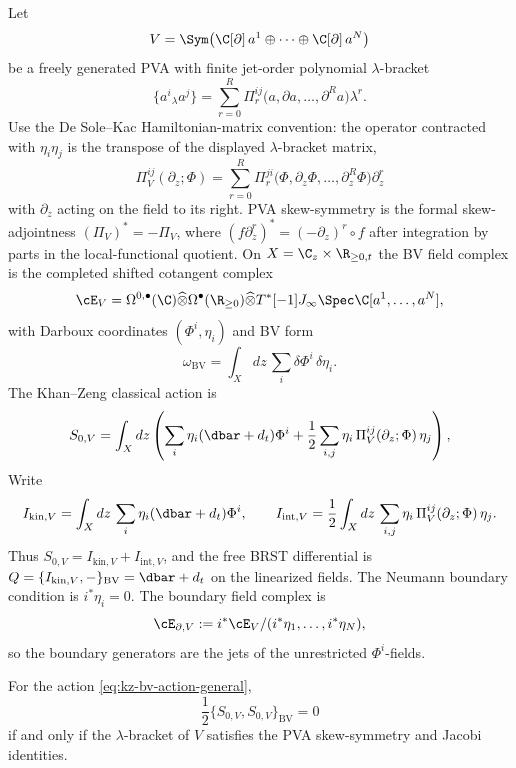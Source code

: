 \begin{construction}
\label{cons:kz-bv-fields-action}
Let
\[
V=\Sym\bigl(\C[\partial]\,a^1\oplus\cdots\oplus
\C[\partial]\,a^N\bigr)
\]
be a freely generated PVA with finite jet-order polynomial
$\lambda$-bracket
\[
\{a^i{}_\lambda a^j\}
=
\sum_{r=0}^{R} \Pi^{ij}_{r}
\bigl(a,\partial a,\ldots,\partial^{R}a\bigr)\lambda^r .
\]
Use the De Sole--Kac Hamiltonian-matrix convention: the operator
contracted with $\eta_i\eta_j$ is the transpose of the displayed
$\lambda$-bracket matrix,
\[
\Pi^{ij}_{V}(\partial_z;\Phi)
=
\sum_{r=0}^{R}\Pi^{ji}_{r}
\bigl(\Phi,\partial_z\Phi,\ldots,\partial_z^{R}\Phi\bigr)
\partial_z^r
\]
with $\partial_z$ acting on the field to its right. PVA
skew-symmetry is the formal skew-adjointness
$(\Pi_V)^*=-\Pi_V$, where
$(f\partial_z^r)^*=(-\partial_z)^r\circ f$ after integration by
parts in the local-functional quotient. On
$X=\C_z\times\R_{\ge 0,t}$ the BV field complex is the completed
shifted cotangent complex
\[
\cE_V
=
\Omega^{0,\bullet}(\C)
\widehat\otimes
\Omega^\bullet(\R_{\ge0})
\widehat\otimes
T^*[-1]J_\infty\Spec\C[a^1,\ldots,a^N],
\]
with Darboux coordinates $(\Phi^i,\eta_i)$ and BV form
\[
\omega_{\mathrm{BV}}
=
\int_X dz\,\sum_i \delta\Phi^i\,\delta\eta_i .
\]
The Khan--Zeng classical action is
\begin{equation}\label{eq:kz-bv-action-general}
S_{0,V}
=
\int_X dz\left(
\sum_i\eta_i(\dbar+d_t)\Phi^i
+
\frac12\sum_{i,j}\eta_i\,
\Pi^{ij}_{V}(\partial_z;\Phi)\,\eta_j
\right),
\end{equation}
Write
\[
I_{\mathrm{kin},V}=\int_X dz\,\sum_i\eta_i(\dbar+d_t)\Phi^i,
\qquad
I_{\mathrm{int},V}
=
\frac12\int_X dz\,
\sum_{i,j}\eta_i\,
\Pi^{ij}_{V}(\partial_z;\Phi)\,\eta_j .
\]
Thus $S_{0,V}=I_{\mathrm{kin},V}+I_{\mathrm{int},V}$, and the
free BRST differential is
$Q=\{I_{\mathrm{kin},V},{-}\}_{\mathrm{BV}}=\dbar+d_t$ on the
linearized fields. The Neumann boundary condition is $i^*\eta_i=0$.
The boundary field
complex is
\[
\cE_{\partial,V}:=
i^*\cE_V/(i^*\eta_1,\ldots,i^*\eta_N),
\]
so the boundary generators are the jets of the unrestricted
$\Phi^i$-fields.
\end{construction}

\begin{lemma}
\label{lem:kz-cme-pva-jacobi}
For the action \eqref{eq:kz-bv-action-general},
\[
\frac12\{S_{0,V},S_{0,V}\}_{\mathrm{BV}}=0
\]
if and only if the $\lambda$-bracket of $V$ satisfies the PVA
skew-symmetry and Jacobi identities.
\end{lemma}

